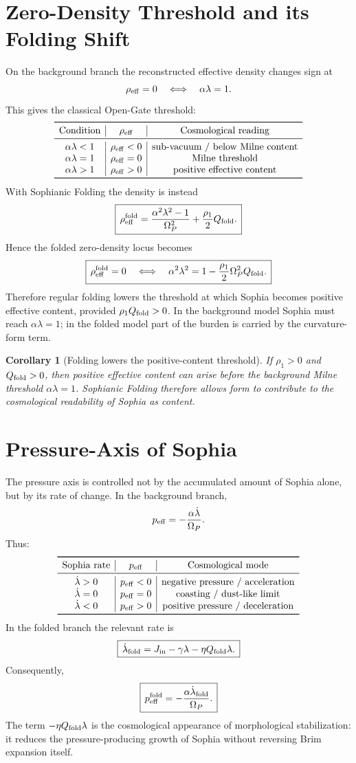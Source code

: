 \documentclass[11pt,a4paper]{article}
\newcommand{\Op}{\Omega_P}
\newcommand{\reff}{\rho_{\rm eff}}
\newcommand{\peff}{p_{\rm eff}}
\newcommand{\Qfold}{Q_{\rm fold}}
\theoremstyle{plain}
\newtheorem{corollary}{Corollary}
\theoremstyle{remark}
\theoremstyle{definition}
\begin{document}
\section{Zero-Density Threshold and its Folding Shift}
On the background branch the reconstructed effective density changes sign at
\[
\reff=0\quad\Longleftrightarrow\quad \alpha\lambda=1.
\]
This gives the classical Open-Gate threshold:
\[
\begin{array}{c|c|c}
\toprule
\text{Condition} & \reff & \text{Cosmological reading}\\
\midrule
\alpha\lambda<1 & \reff<0 & \text{sub-vacuum / below Milne content}\\
\alpha\lambda=1 & \reff=0 & \text{Milne threshold}\\
\alpha\lambda>1 & \reff>0 & \text{positive effective content}\\
\bottomrule
\end{array}
\]
With Sophianic Folding the density is instead
\[
\boxed{\,\reff^{\rm fold}=\frac{\alpha^2\lambda^2-1}{\Op^2}+\frac{\rho_1}{2}\Qfold.\,}
\]
Hence the folded zero-density locus becomes
\[
\boxed{\,\reff^{\rm fold}=0
\quad\Longleftrightarrow\quad
\alpha^2\lambda^2=1-\frac{\rho_1}{2}\Op^2\Qfold.\,}
\]
Therefore regular folding lowers the threshold at which Sophia becomes positive effective content,
provided \(\rho_1\Qfold>0\). In the background model Sophia must reach \(\alpha\lambda=1\); in the
folded model part of the burden is carried by the curvature-form term.

\begin{corollary}[Folding lowers the positive-content threshold]
If \(\rho_1>0\) and \(\Qfold>0\), then positive effective content can arise before the background
Milne threshold \(\alpha\lambda=1\). Sophianic Folding therefore allows form to contribute to the
cosmological readability of Sophia as content.
\end{corollary}

\section{Pressure-Axis of Sophia}
The pressure axis is controlled not by the accumulated amount of Sophia alone, but by its rate of
change. In the background branch,
\[
\peff=-\frac{\alpha\dot\lambda}{\Op}.
\]
Thus:
\[
\begin{array}{c|c|c}
\toprule
\text{Sophia rate} & \peff & \text{Cosmological mode}\\
\midrule
\dot\lambda>0 & \peff<0 & \text{negative pressure / acceleration}\\
\dot\lambda=0 & \peff=0 & \text{coasting / dust-like limit}\\
\dot\lambda<0 & \peff>0 & \text{positive pressure / deceleration}\\
\bottomrule
\end{array}
\]
In the folded branch the relevant rate is
\[
\boxed{\,\dot\lambda_{\rm fold}=J_{\rm in}-\gamma\lambda-\eta\Qfold\lambda.\,}
\]
Consequently,
\[
\boxed{\,\peff^{\rm fold}=-\frac{\alpha\dot\lambda_{\rm fold}}{\Op}.\,}
\]
The term \(-\eta\Qfold\lambda\) is the cosmological appearance of morphological stabilization: it
reduces the pressure-producing growth of Sophia without reversing Brim expansion itself.
\end{document}
